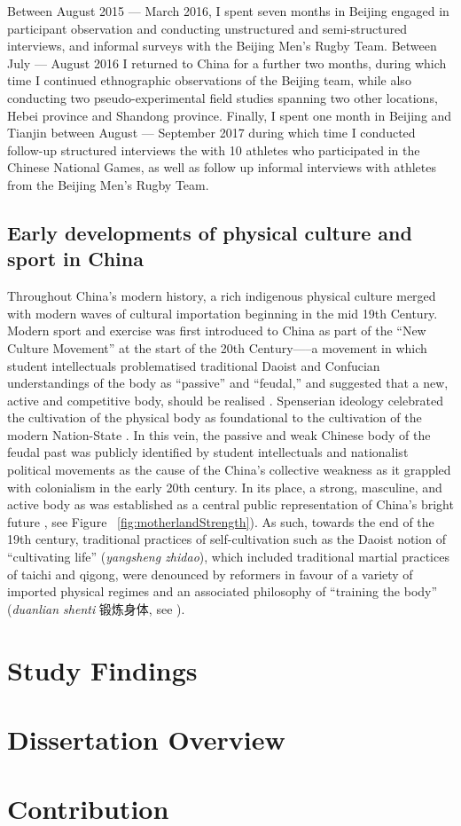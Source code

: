 Between August 2015 --- March 2016, I spent seven months in Beijing engaged in participant observation and conducting unstructured and semi-structured interviews, and informal surveys with the Beijing Men's Rugby Team. Between July --- August 2016 I returned to China for a further two months, during which time I continued ethnographic observations of the Beijing team, while also conducting two pseudo-experimental field studies spanning two other locations, Hebei province and Shandong province. Finally, I spent one month in Beijing and Tianjin between August --- September 2017 during which time I conducted follow-up structured interviews the with 10 athletes who participated in the Chinese National Games, as well as follow up informal interviews with athletes from the Beijing Men's Rugby Team.



\subsection{Early developments of physical culture and sport in China}
Throughout China's modern history, a rich indigenous physical culture merged with modern waves of cultural importation beginning in the mid 19th Century. Modern sport and exercise was first introduced to China as part of the ``New Culture Movement'' at the start of the 20th Century—--a movement in which student intellectuals problematised traditional Daoist and Confucian understandings of the body as ``passive'' and ``feudal,'' and suggested that a new, active and competitive body, should be realised \citep{Ge2005}.  Spenserian ideology celebrated the cultivation of the physical body as foundational to the cultivation of the modern Nation-State \citep{Morris2004}. In this vein, the passive and weak Chinese body of the feudal past was publicly identified by student intellectuals and nationalist political movements as the cause of the China's collective weakness as it grappled with colonialism in the early 20th century.
In its place, a strong, masculine, and active body as was established as a central public representation of China's bright future \citep{Brownell1995}, see Figure ~\ref{fig:motherlandStrength}).  As such, towards the end of the 19th century, traditional practices of self-cultivation such as the Daoist notion of ``cultivating life'' (\textit{yangsheng zhidao}), which included traditional martial practices of taichi and qigong, were denounced by reformers in favour of a variety of imported physical regimes and an associated philosophy of ``training the body'' (\textit{duanlian shenti} 锻炼身体, see \cite{Farquhar2012}).

\section{Study Findings}

\section{Dissertation Overview}

\section{Contribution}
